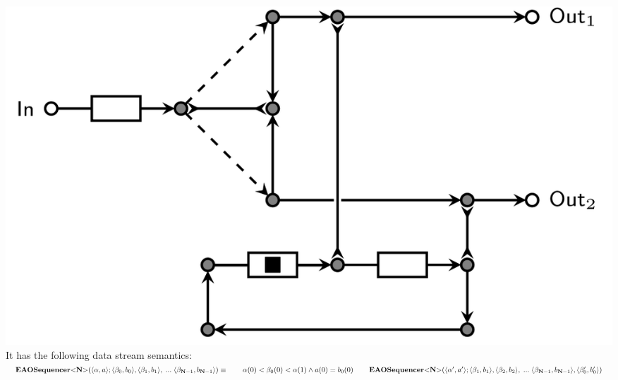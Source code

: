 \includegraphics[]{img/EAOSeq.png}\\
%
It has the following data stream semantics:\\
%
$
\vspace{0.2cm}\eaoseq (\langle \alpha, a \rangle;\langle \beta_0, b_0 \rangle, \langle \beta_1, b_1 \rangle,\;...\; \langle \beta_{\textbf{N}-1}, b_{\textbf{N}-1} \rangle) \equiv \\
\vspace{0.2cm} \hphantom \qquad \alpha(0) < \beta_0(0) < \alpha(1) \land a(0) = b_0(0) \\
\vspace{0.2cm} \hphantom \qquad \eaoseq (\langle \alpha', a' \rangle; \langle \beta_1, b_1 \rangle,\langle \beta_2, b_2 \rangle,\;...\; \langle \beta_{\textbf{N}-1}, b_{\textbf{N}-1} \rangle, \langle \beta_0', b_0' \rangle)
$
